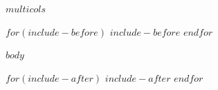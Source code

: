\documentclass[
$if(fontsize)$
$fontsize$,
$endif$
a4paper, landscape]{article}
\newcommand{\numbermulticols}{$multicols$}
\newcommand{\numbermulticols}{3}
\begin{document}
\footnotesize

\begin{multicols*}{\numbermulticols}

\raggedcolumns


\setlength{\premulticols}{0.25pt}
\setlength{\postmulticols}{0.25pt}
\setlength{\multicolsep}{0.25pt}
\setlength{\columnsep}{2mm}


$for(include-before)$
  $include-before$
$endfor$

$body$

\end{multicols*}


$for(include-after)$
  $include-after$
$endfor$
\end{document}
